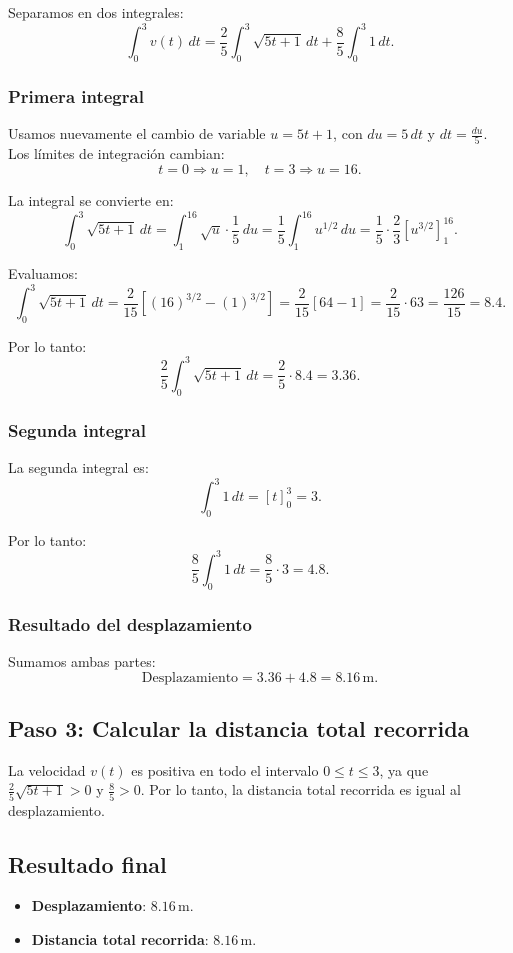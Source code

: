 \documentclass[11pt,letterpaper]{article}
\begin{document}
Separamos en dos integrales:
\[
\int_{0}^{3} v(t) \, dt = \frac{2}{5} \int_{0}^{3} \sqrt{5t + 1} \, dt + \frac{8}{5} \int_{0}^{3} 1 \, dt.
\]

\subsubsection*{Primera integral}
Usamos nuevamente el cambio de variable \(u = 5t + 1\), con \(du = 5 \, dt\) y \(dt = \frac{du}{5}\). Los límites de integración cambian:
\[
t = 0 \Rightarrow u = 1, \quad t = 3 \Rightarrow u = 16.
\]

La integral se convierte en:
\[
\int_{0}^{3} \sqrt{5t + 1} \, dt = \int_{1}^{16} \sqrt{u} \cdot \frac{1}{5} \, du = \frac{1}{5} \int_{1}^{16} u^{1/2} \, du = \frac{1}{5} \cdot \frac{2}{3} \left[ u^{3/2} \right]_{1}^{16}.
\]

Evaluamos:
\[
\int_{0}^{3} \sqrt{5t + 1} \, dt = \frac{2}{15} \left[ (16)^{3/2} - (1)^{3/2} \right] = \frac{2}{15} \left[ 64 - 1 \right] = \frac{2}{15} \cdot 63 = \frac{126}{15} = 8.4.
\]

Por lo tanto:
\[
\frac{2}{5} \int_{0}^{3} \sqrt{5t + 1} \, dt = \frac{2}{5} \cdot 8.4 = 3.36.
\]

\subsubsection*{Segunda integral}
La segunda integral es:
\[
\int_{0}^{3} 1 \, dt = [t]_{0}^{3} = 3.
\]

Por lo tanto:
\[
\frac{8}{5} \int_{0}^{3} 1 \, dt = \frac{8}{5} \cdot 3 = 4.8.
\]

\subsubsection*{Resultado del desplazamiento}
Sumamos ambas partes:
\[
\text{Desplazamiento} = 3.36 + 4.8 = 8.16 \, \text{m}.
\]

\subsection*{Paso 3: Calcular la distancia total recorrida}

La velocidad \(v(t)\) es positiva en todo el intervalo \(0 \leq t \leq 3\), ya que \(\frac{2}{5} \sqrt{5t + 1} > 0\) y \(\frac{8}{5} > 0\). Por lo tanto, la distancia total recorrida es igual al desplazamiento.

\subsection*{Resultado final}
\begin{itemize}
    \item \textbf{Desplazamiento}: \(8.16 \, \text{m}\).
    \item \textbf{Distancia total recorrida}: \(8.16 \, \text{m}\).
\end{itemize}
\end{document}
